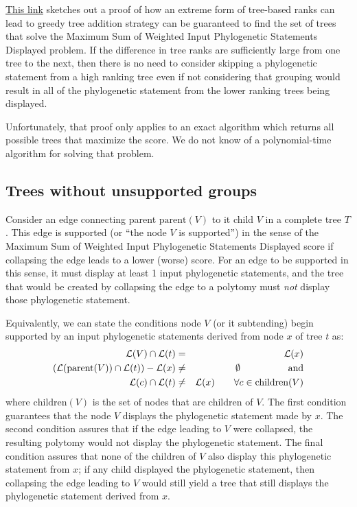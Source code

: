 \documentclass[11pt]{article}
\newcommand{\ps}{phylogenetic statement\xspace}
\newcommand{\pss}{phylogenetic statements\xspace}
\newcommand{\PSs}{Phylogenetic Statements\xspace}
\newcommand{\SWIPSD}{Sum of Weighted Input \PSs Displayed\xspace}
\newcommand{\MSWIPSD}{Maximum \SWIPSD \xspace}
\newcommand{\leafLabels}[1]{\ensuremath{\mathcal{L}(#1)}}
\newcommand{\parent}[1]{\ensuremath{\mbox{parent}(#1)}}
\newcommand{\children}[1]{\ensuremath{\mbox{children}(#1)}}
\begin{document}
\href{https://github.com/OpenTreeOfLife/treemachine/wiki/MaxWeightOfInputTreeEdgesDisplayed}{This link}
    sketches out a proof of how an extreme form of tree-based ranks
    can lead to greedy tree addition strategy can be guaranteed to 
    find the set of trees that solve the \MSWIPSD problem.
If the difference in tree ranks are sufficiently large from one tree to the next,
    then there is no need to consider skipping a \ps from a high ranking tree
    even if not considering that grouping would result in all of the \ps
    from the lower ranking trees being displayed.

Unfortunately, that proof only applies to an exact algorithm which returns
    all possible trees that maximize the score.
We do not know of a polynomial-time algorithm for solving that problem.

\subsection{Trees without unsupported groups}\label{unsupportedTheory}
Consider an edge connecting parent $\parent{V}$ to it child $V$ in a complete tree $T$.
This edge is supported (or ``the node $V$ is supported'') in the sense of the \MSWIPSD score if
    collapsing the edge leads to a lower (worse) score.
For an edge to be supported in this sense, it must display at least 1 input \pss, and
    the tree that would be created by collapsing the edge to a polytomy must
    {\em not} display those \ps.

Equivalently, we can state the conditions node $V$ (or it subtending) begin supported
    by an input \pss derived from node $x$ of tree $t$ as:
\begin{eqnarray}
    \leafLabels{V} \cap \leafLabels{t} & = & \leafLabels{x}\\
    \left(\leafLabels{\parent{V}} \cap \leafLabels{t}\right) - \leafLabels{x} & \neq &\emptyset\hskip 5em \mbox{and}\\
    \leafLabels{c} \cap \leafLabels{t} & \neq & \leafLabels{x} \hskip 2em \forall c \in \children{V}
\end{eqnarray}
where $\children{V}$ is the set of nodes that are children of $V$.
The first condition guarantees that the node $V$ displays the \ps made by $x$.
The second condition assures that if the edge leading to $V$ were collapsed, the resulting polytomy would not display the \ps.
The final condition assures that none of the children of $V$ also display this \ps from $x$;
    if any child displayed the \ps, then collapsing the edge leading to $V$ would still
    yield a tree that still displays the \ps derived from $x$.
\end{document}
